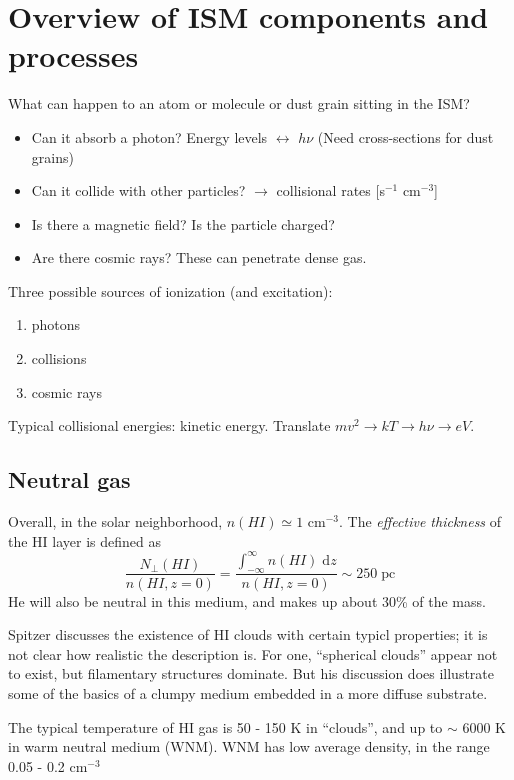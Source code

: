 \documentclass[11pt]{article}
\newcommand{\mar}[1]{\hspace{0pt}\marginpar{-\textcolor{black}{#1}-}}
\begin{document}
\setlength{\parskip}{0ex}
\tableofcontents\newpage
\setlength{\parskip}{2ex}
\reversemarginpar

\section{Overview of ISM components and processes}
\mar{6}What can happen to an atom or molecule or dust grain sitting in the ISM?
\begin{itemize}
    \item Can it absorb a photon? Energy levels $\leftrightarrow$ $h\nu$
        (Need cross-sections for dust grains)
    \item Can it collide with other particles? $\rightarrow$ collisional
        rates [s$^{-1}$ cm$^{-3}$]
    \item Is there a magnetic field? Is the particle charged?
    \item Are there cosmic rays? These can penetrate dense gas.
\end{itemize}
Three possible sources of ionization (and excitation):
\begin{enumerate}
    \item photons
    \item collisions
    \item cosmic rays
\end{enumerate}
Typical collisional energies: kinetic energy.
Translate $mv^{2} \rightarrow kT \rightarrow h\nu \rightarrow eV$.

\subsection{Neutral gas}
\mar{7}Overall, in the solar neighborhood, $n(HI) \simeq 1$ cm$^{-3}$.
The \textit{effective thickness} of the HI layer is defined as
\[
    \frac{N_{\perp}(HI)}{n(HI, z=0)}
    = \frac{\int_{-\infty}^{\infty} n(HI)\;\mathrm{d}z}{n(HI, z=0)}
    \sim 250 \;\mathrm{pc}
    \]
He will also be neutral in this medium, and makes up about 30\% of the mass.

Spitzer discusses the existence of HI clouds with certain typicl properties;
it is not clear how realistic the description is. For one, ``spherical clouds''
appear not to exist, but filamentary structures dominate. But his discussion
does illustrate some of the basics of a clumpy medium embedded in a more diffuse
substrate.

The typical temperature of HI gas is 50 - 150 K in ``clouds'', and up to
$\sim$ 6000 K in warm neutral medium (WNM). WNM has low average density,
in the range 0.05 - 0.2 cm$^{-3}$
\end{document}
